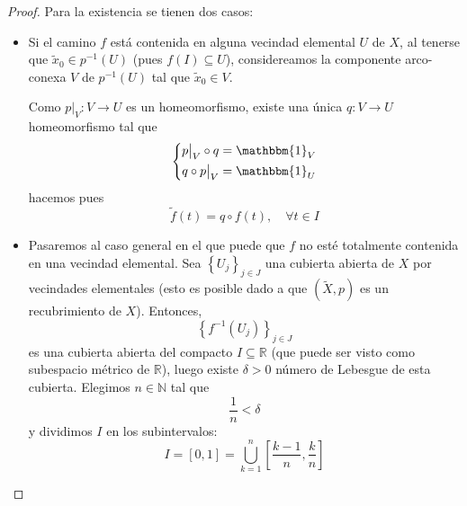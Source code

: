 \documentclass[12pt]{report}
\theoremstyle{largebreak}
\newcommand\cf[3]{\ensuremath{#1:#2\rightarrow#3}}
\newcommand{\bbm}[1]{\ensuremath{\mathbbm{#1}}}
\begin{document}
    \begin{proof}
        Para la existencia se tienen dos casos:
        \begin{itemize}
            \item Si el camino $f$ está contenida en alguna vecindad elemental $U$ de $X$, al tenerse que $\widetilde{x}_0\in p^{-1}(U)$ (pues $f(I)\subseteq U$), considereamos la componente arco-conexa $V$ de $p^{-1}(U)$ tal que $\widetilde{x}_0\in V$.
            
            Como $\cf{p\big|_{V}}{V}{U}$ es un homeomorfismo, existe una única $\cf{q}{V}{U}$ homeomorfismo tal que
            \begin{equation*}
                \left\{
                    \begin{split}
                        p\big|_{V} \circ q & = \bbm{1}_{V} \\
                        q \circ p\big|_{V} & = \bbm{1}_{U} \\
                    \end{split}
                \right.
            \end{equation*}
            hacemos pues
            \begin{equation*}
                \widetilde{f}(t)=q\circ f(t),\quad\forall t\in I
            \end{equation*}
            \item Pasaremos al caso general en el que puede que $f$ no esté totalmente contenida en una vecindad elemental. Sea $\left\{U_j\right\}_{j\in J}$ una cubierta abierta de $X$ por vecindades elementales (esto es posible dado a que $(\widetilde{X},p)$ es un recubrimiento de $X$). Entonces,
            \begin{equation*}
                \left\{f^{-1}(U_j) \right\}_{ j\in J}
            \end{equation*}
            es una cubierta abierta del compacto $I\subseteq\mathbb{R}$ (que puede ser visto como subespacio métrico de $\mathbb{R}$), luego existe $\delta>0$ número de Lebesgue de esta cubierta. Elegimos $n\in\mathbb{N}$ tal que
            \begin{equation*}
                \frac{1}{n}<\delta
            \end{equation*}
            y dividimos $I$ en los subintervalos:
            \begin{equation*}
                I=[0,1]=\bigcup_{ k=1}^n \left[\frac{k-1}{n},\frac{k}{n} \right]
            \end{equation*}

\end{itemize}
\end{proof}
\end{document}
